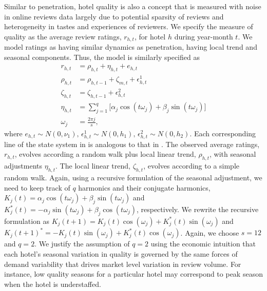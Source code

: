 \documentclass[12pt, leqno]{article}
\begin{document}
Similar to penetration, hotel quality is also a concept that is measured with noise in online reviews data largely due to potential sparsity of reviews and heterogeneity in tastes and experiences of reviewers. We specify the measure of quality as the average review ratings, $r_{h,t}$, for hotel $h$ during year-month $t$. We model ratings as having similar dynamics as penetration, having local trend and seasonal components. Thus, the model is similarly specified as 
\begin{equation}\label{eq:ratings_dlm}
\begin{split}
r_{h,t}&=\rho_{h,t}+\eta_{h,t}+e_{h,t}\\
\rho_{h,t}&=\rho_{h,t-1}+\zeta_{m,t}+\epsilon_{h,t}^{1} \\
\zeta_{h,t} &= \zeta_{h,t-1} +\epsilon_{h,t}^{2} \\
\eta_{h,t} &=\sum_{j=1}^{q}\big[\alpha_j\cos(t\omega_j)+\beta_j\sin(t\omega_j)\big] \\
\omega_j &= \frac{2\pi j}{s},
\end{split}
\end{equation}
where $e_{h,t}\sim N(0,\nu_1)\text{, }\epsilon_{h,t}^{1}\sim N(0,h_1)\text{, }\epsilon_{h,t}^{2}\sim N(0,h_2)$. Each corresponding line of the state system in  is analogous to that in . The observed average ratings, $r_{h,t}$, evolves according a random walk plus local linear trend, $\rho_{h,t}$, with seasonal adjustments $\eta_{h,t}$. The local linear trend, $\zeta_{h,t}$, evolves according to a simple random walk. Again, using a recursive formulation of the seasonal adjustment, we need to keep track of $q$ harmonics and their conjugate harmonics, $K_j(t)=\alpha_j\cos(t\omega_j)+\beta_j\sin(t\omega_j)$ and $K_j^{*}(t)=-\alpha_j\sin(t\omega_j)+\beta_j\cos(t\omega_j)$, respectively. We rewrite the recursive formulation as $K_j(t+1)=K_j(t)\cos(\omega_j)+K_j^{*}(t)\sin(\omega_j)$ and $K_j(t+1)^{*}=-K_j(t)\sin(\omega_j)+K_j^{*}(t)\cos(\omega_j)$. Again, we choose $s=12$ and $q=2$. We justify the assumption of $q=2$ using the economic intuition that each hotel's seasonal variation in quality is governed by the same forces of demand variability that drives market level variation in review volume. For instance, low quality seasons for a particular hotel may correspond to peak season when the hotel is understaffed.
\end{document}
